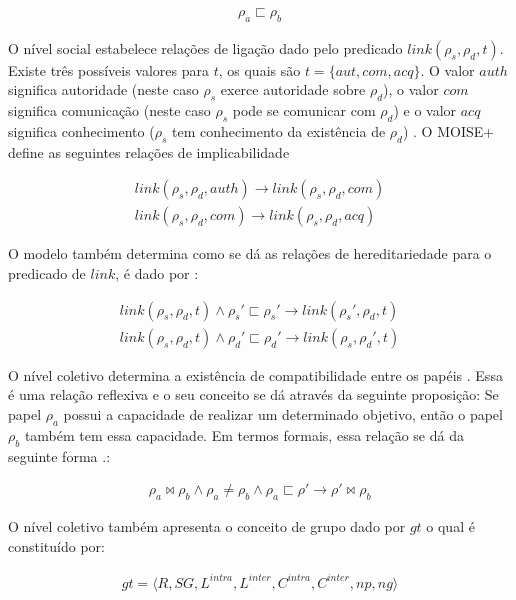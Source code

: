 \begin{eqnarray}
\rho_a \sqsubset \rho_b
\end{eqnarray}

O nível social estabelece relações de ligação dado pelo predicado $link(\rho_s,\rho_d,t)$. Existe três possíveis valores para $t$, os quais são $t = \{aut, com, acq\}$. O valor $auth$ significa autoridade (neste caso $\rho_s$ exerce autoridade sobre $\rho_d$), o valor $com$ significa comunicação (neste caso $\rho_s$ pode se comunicar com $\rho_d$) e o valor $acq$ significa conhecimento ($\rho_s$ tem conhecimento da existência de $\rho_d$) \cite{moiseframework} \cite{dynamicagenttemporalstruct}. O MOISE+ define as seguintes relações de implicabilidade

\begin{eqnarray}\nonumber
	link(\rho_s,\rho_d,auth) \to link(\rho_s,\rho_d,com) \nonumber \\
	link(\rho_s,\rho_d,com) \to link(\rho_s,\rho_d,acq) 
\end{eqnarray}

O modelo também determina como se dá as relações de hereditariedade para o predicado de $link$, é dado por \cite{moiseframework} \cite{dynamicagenttemporalstruct}: 

\begin{eqnarray}\nonumber
	link(\rho_s,\rho_d,t) \wedge \rho_s' \sqsubset \rho_s' \to link(\rho_s',\rho_d,t) \nonumber \\
	link(\rho_s,\rho_d,t) \wedge \rho_d' \sqsubset \rho_d' \to link(\rho_s,\rho_d',t) 	
\end{eqnarray}


O nível coletivo determina a existência de compatibilidade entre os papéis \cite{moiseframework}. Essa é uma relação reflexiva e o seu conceito se dá através da seguinte proposição: Se papel $\rho_a$ possui a capacidade de realizar um determinado objetivo, então o papel $\rho_b$ também tem essa capacidade. Em termos formais, essa relação se dá da seguinte forma \cite{moiseframework} \cite{deonticOne}.:

\begin{eqnarray}
	\rho_a \bowtie \rho_b \wedge \rho_a \neq \rho_b \wedge \rho_a \sqsubset \rho' \to \rho' \bowtie \rho_b 
\end{eqnarray}

O nível coletivo também apresenta o conceito de grupo dado por $gt$ o qual é constituído por:

\begin{eqnarray}
	gt = \langle R,SG,L^{intra},L^{inter},C^{intra},C^{inter},np,ng\rangle 
\end{eqnarray}

